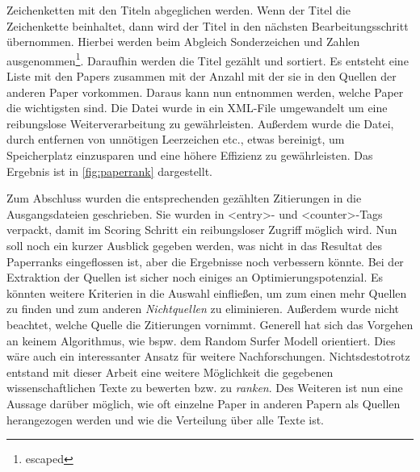 Zeichenketten mit den Titeln abgeglichen werden. Wenn der Titel die
Zeichenkette beinhaltet, dann wird der Titel in den nächsten
Bearbeitungsschritt übernommen. Hierbei werden beim Abgleich
Sonderzeichen und Zahlen ausgenommen\footnote{escaped}.  Daraufhin
werden die Titel gezählt und sortiert. Es entsteht eine Liste mit den
Papers zusammen mit der Anzahl mit der sie in den Quellen der anderen
Paper vorkommen. Daraus kann nun entnommen werden, welche Paper die
wichtigsten sind. Die Datei wurde in ein XML-File umgewandelt um eine
reibungslose Weiterverarbeitung zu gewährleisten. Außerdem wurde die
Datei, durch entfernen von unnötigen Leerzeichen etc., etwas
bereinigt, um Speicherplatz einzusparen und eine höhere Effizienz zu
gewährleisten. Das Ergebnis ist in \autoref{fig:paperrank}
dargestellt.







Zum Abschluss wurden die entsprechenden gezählten Zitierungen in die
Ausgangsdateien geschrieben. Sie wurden in <entry>- und <counter>-Tags
verpackt, damit im Scoring Schritt ein reibungsloser Zugriff möglich
wird.  Nun soll noch ein kurzer Ausblick gegeben werden, was nicht in
das Resultat des Paperranks eingeflossen ist, aber die Ergebnisse noch
verbessern könnte. Bei der Extraktion der Quellen ist sicher noch
einiges an Optimierungspotenzial. Es könnten weitere Kriterien in die
Auswahl einfließen, um zum einen mehr Quellen zu finden und zum
anderen \emph{Nichtquellen} zu eliminieren. Außerdem wurde nicht
beachtet, welche Quelle die Zitierungen vornimmt. Generell hat sich
das Vorgehen an keinem Algorithmus, wie bspw. dem Random Surfer Modell
orientiert. Dies wäre auch ein interessanter Ansatz für weitere
Nachforschungen.  Nichtsdestotrotz entstand mit dieser Arbeit eine
weitere Möglichkeit die gegebenen wissenschaftlichen Texte zu bewerten
bzw. zu \emph{ranken}. Des Weiteren ist nun eine Aussage darüber
möglich, wie oft einzelne Paper in anderen Papern als Quellen
herangezogen werden und wie die Verteilung über alle Texte ist.




